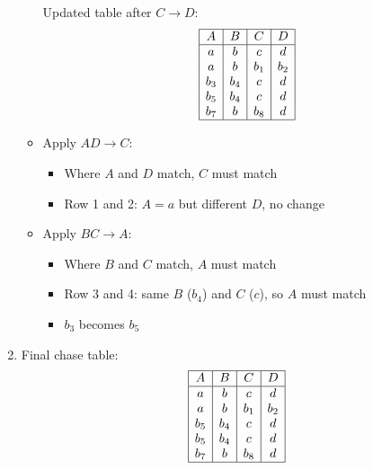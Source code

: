 \begin{example}
\begin{enumerate}
\begin{itemize}
        Updated table after $C \rightarrow D$:
        \[
        \begin{array}{|c|c|c|c|}
        \hline
        A & B & C & D \\
        \hline
        a & b & c & d \\
        a & b & b_1 & b_2 \\
        b_3 & b_4 & c & d \\
        b_5 & b_4 & c & d \\
        b_7 & b & b_8 & d \\
        \hline
        \end{array}
        \]

        \item Apply $AD \rightarrow C$:
            \begin{itemize}
            \item Where $A$ and $D$ match, $C$ must match
            \item Row 1 and 2: $A=a$ but different $D$, no change
            \end{itemize}

        \item Apply $BC \rightarrow A$:
            \begin{itemize}
            \item Where $B$ and $C$ match, $A$ must match
            \item Row 3 and 4: same $B$ ($b_4$) and $C$ ($c$), so $A$ must match
            \item $b_3$ becomes $b_5$
            \end{itemize}
    \end{itemize}

    \item Final chase table:
        \[
        \begin{array}{|c|c|c|c|}
        \hline
        A & B & C & D \\
        \hline
        a & b & c & d \\
        a & b & b_1 & b_2 \\
        b_5 & b_4 & c & d \\
        b_5 & b_4 & c & d \\
        b_7 & b & b_8 & d \\
        \hline
        \end{array}
        \]


\end{enumerate}
\end{example}
